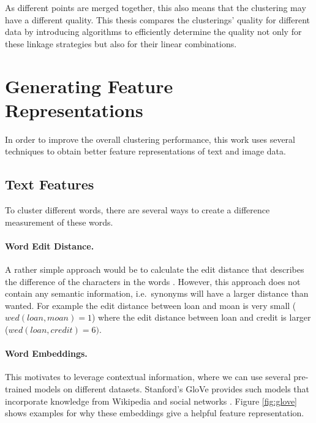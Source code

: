 As different points are merged together, this also means that the clustering may have a different quality. This thesis compares the clusterings' quality for different data by introducing algorithms to efficiently determine the quality not only for these linkage strategies but also for their linear combinations.

\section{Generating Feature Representations}

In order to improve the overall clustering performance, this work uses several techniques to obtain better feature representations of text and image data. 

\subsection{Text Features}

To cluster different words, there are several ways to create a difference measurement of these words. 

\paragraph{Word Edit Distance.} A rather simple approach would be to calculate the edit distance that describes the difference of the characters in the words \cite{ristad1998learning}. However, this approach does not contain any semantic information, i.e.\ synonyms will have a larger distance than wanted. For example the edit distance between loan and moan is very small ($wed(loan, moan) = 1$) where the edit distance between loan and credit is larger ($wed(loan, credit) = 6)$.\\ 

\paragraph{Word Embeddings.} This motivates to leverage contextual information, where we can use several pre-trained models on different datasets. Stanford's GloVe provides such models that incorporate knowledge from Wikipedia and social networks \cite{pennington2014glove}. Figure \ref{fig:glove} shows examples for why these embeddings give a helpful feature representation.\\

